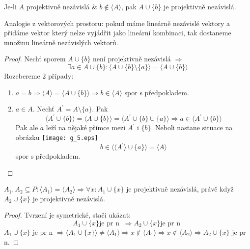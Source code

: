 \begin{lemma}\label{kpp:point_add_ind}
	Je-li $A$ projektivně nezávislá \& $b\not\in\langle A\rangle$, pak $A\cup\{b\}$ je projektivně nezávislá.

	Analogie z vektorových prostoru: pokud máme lineárně nezávislé vektory a přidáme vektor který nelze vyjádřit jako lineární kombinaci, tak dostaneme množinu lineárně nezávislých vektorů.
\end{lemma}
\begin{proof}
	Nechť sporem $A\cup\{b\}$ není projektivně nezávislá $\Rightarrow$
	\[ \exists a \in A\cup\{b\}: \langle A\cup\{b\} \setminus \{ a \} \rangle = \langle A\cup\{b\} \rangle \]
	Rozebereme 2 případy:
	\begin{enumerate}
		\item $a = b \Rightarrow \langle A \rangle = \langle A \cup \{ b\} \rangle \Rightarrow b \in \langle A \rangle$ spor s předpokladem.
		\item $a \in A$.
			Nechť $A^{\prime} = A \setminus \{ a \}$.
			Pak
			\[ \langle A^{\prime} \cup \{ b \} \rangle = \langle A \cup \{ b \} \rangle = \langle A^{\prime} \cup \{ b \} \cup \{ a \} \rangle \Rightarrow a \in \langle A^{\prime} \cup \{ b \} \rangle \]
			Pak ale $a$ leží na nějaké přímce mezi $A^{\prime}$ i $\{ b \}$.
			Neboli nastane situace na obrázku
			\texttt{[image: g\_5.eps]}
			\[ b \in \langle\langle A^{\prime} \rangle \cup \{ a \} \rangle = \langle A \rangle \]
			spor s předpokladem.
	\end{enumerate}
\end{proof}

\begin{observation}\label{kpp:pr_ind_equiv}
    $A_1,A_2\subseteq P: \langle A_1\rangle=\langle A_2\rangle\Rightarrow \forall x: A_1\cup\{x\}$ je projektivně nezávislá, právě když $A_2\cup\{x\}$ je projektivně nezávislá.
\end{observation}
\begin{proof}
	Tvrzení je symetrické, stačí ukázat:
	\[ A_1\cup\{x\} \text{je pr n }\ \Rightarrow A_2\cup\{x\} \text{je pr n } \]
	$A_1\cup\{x\}$ je pr n $\Rightarrow \langle A_1\cup\{x\} \rangle \ne \langle A_1 \rangle \Rightarrow x \notin \langle A_1 \rangle \Rightarrow x \notin \langle A_2 \rangle \Rightarrow A_2\cup\{x\}$ je pr n.
\end{proof}

